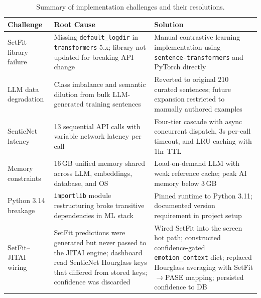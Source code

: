 \begin{table}[htbp]
  \centering
  \caption{Summary of implementation challenges and their resolutions.}
  \label{tab:challenges}
  \begin{tabularx}{\textwidth}{@{}lXX@{}}
    \toprule
    \textbf{Challenge} & \textbf{Root Cause} & \textbf{Solution} \\
    \midrule
    SetFit library failure &
      Missing \texttt{default\_logdir} in \texttt{transformers} 5.x; library not updated for breaking API change &
      Manual contrastive learning implementation using \texttt{sentence-transformers} and PyTorch directly \\
    \addlinespace
    LLM data degradation &
      Class imbalance and semantic dilution from bulk LLM-generated training sentences &
      Reverted to original 210 curated sentences; future expansion restricted to manually authored examples \\
    \addlinespace
    SenticNet latency &
      13 sequential API calls with variable network latency per call &
      Four-tier cascade with async concurrent dispatch, 3s per-call timeout, and LRU caching with 1hr TTL \\
    \addlinespace
    Memory constraints &
      16\,GB unified memory shared across LLM, embeddings, database, and OS &
      Load-on-demand LLM with weak reference cache; peak AI memory below 3\,GB \\
    \addlinespace
    Python 3.14 breakage &
      \texttt{importlib} module restructuring broke transitive dependencies in ML stack &
      Pinned runtime to Python 3.11; documented version requirement in project setup \\
    \addlinespace
    SetFit--JITAI wiring &
      SetFit predictions were generated but never passed to the JITAI engine; dashboard read SenticNet Hourglass keys that differed from stored keys; confidence was discarded &
      Wired SetFit into the screen hot path; constructed confidence-gated \texttt{emotion\_context} dict; replaced Hourglass averaging with SetFit$\rightarrow$PASE mapping; persisted confidence to DB \\
    \bottomrule
  \end{tabularx}
\end{table}
